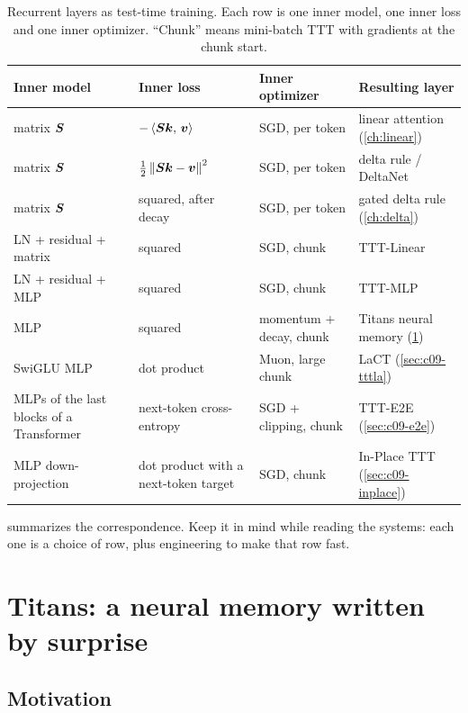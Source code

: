 \begin{table}[t]
\centering\small
\caption{Recurrent layers as test-time training. Each row is one inner model, one inner loss
and one inner optimizer. ``Chunk'' means mini-batch TTT with gradients at the chunk start.}
\label{tab:c09-family}
\begin{tabularx}{\textwidth}{@{}>{\raggedright\arraybackslash}p{3.1cm} >{\raggedright\arraybackslash}p{2.7cm} >{\raggedright\arraybackslash}p{2.6cm} >{\raggedright\arraybackslash}X@{}}
\toprule
Inner model & Inner loss & Inner optimizer & Resulting layer \\
\midrule
matrix $\bm{S}$ & $-\left\langle \bm{S}\bm{k},\, \bm{v}\right\rangle$ & SGD, per token & linear attention (\cref{ch:linear}) \\
matrix $\bm{S}$ & $\frac12\left\lVert \bm{S}\bm{k}-\bm{v}\right\rVert^2$ & SGD, per token & delta rule / DeltaNet \\
matrix $\bm{S}$ & squared, after decay & SGD, per token & gated delta rule (\cref{ch:delta}) \\
LN + residual + matrix & squared & SGD, chunk & TTT-Linear \\
LN + residual + MLP & squared & SGD, chunk & TTT-MLP \\
MLP & squared & momentum + decay, chunk & Titans neural memory (\cref{sec:c09-titans}) \\
SwiGLU MLP & dot product & Muon, large chunk & LaCT (\cref{sec:c09-tttla}) \\
MLPs of the last blocks of a Transformer & next-token cross-entropy & SGD + clipping, chunk & TTT-E2E (\cref{sec:c09-e2e}) \\
MLP down-projection & dot product with a next-token target & SGD, chunk & In-Place TTT (\cref{sec:c09-inplace}) \\
\bottomrule
\end{tabularx}
\end{table}

 summarizes the correspondence. Keep it in mind while reading the
systems: each one is a choice of row, plus engineering to make that row fast.

\section{Titans: a neural memory written by surprise}\label{sec:c09-titans}

\subsection{Motivation}

